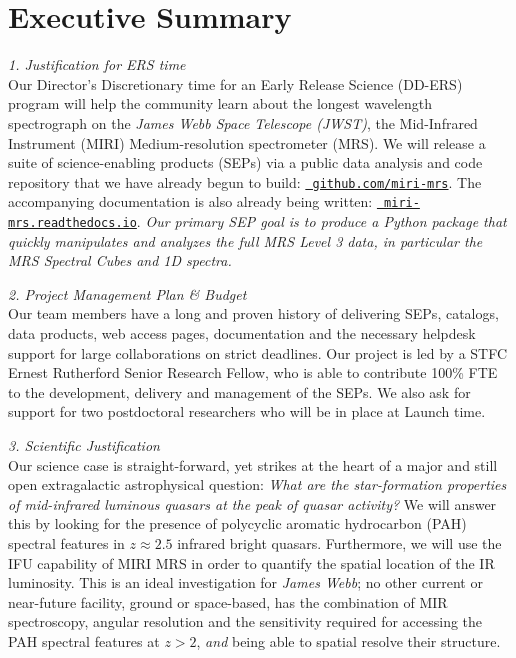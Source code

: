 \vspace{-4pt}
\section*{{\sc Executive Summary}}

\vspace{-6pt}
\noindent
{\it 1. Justification for ERS time}\\
Our Director’s Discretionary time for an Early Release Science
(DD-ERS) program will help the community learn about the longest
wavelength spectrograph on the {\it James Webb Space Telescope (JWST)},
the Mid-Infrared Instrument (MIRI) Medium-resolution spectrometer
(MRS).  We will release a suite of science-enabling products (SEPs)
via a public data analysis and code repository that we have already
begun to build: \href{https://github.com/miri-mrs}{\tt
github.com/miri-mrs}.  The accompanying documentation is also already
being written: \href{http://miri-mrs.readthedocs.io/}{{\tt
miri-mrs.readthedocs.io}}.  {\it Our primary SEP goal is to produce a
Python package that quickly manipulates and analyzes the full MRS
Level 3 data, in particular the MRS Spectral Cubes and 1D spectra. }

\smallskip 
\smallskip \smallskip
\noindent
{\it 2. Project Management Plan \& Budget} \\
Our team members have a long and proven history of delivering SEPs, 
catalogs, data products, web access pages, documentation and the
necessary helpdesk support for large collaborations on strict
deadlines.  Our project is led by a STFC Ernest Rutherford Senior
Research Fellow, who is able to contribute 100\% FTE to the
development, delivery and management of the SEPs.  We also ask for
support for two postdoctoral researchers who will be in place at
Launch time.

\smallskip 
\smallskip \smallskip
\noindent
{\it 3. Scientific Justification}\\
Our science case is straight-forward, yet strikes at the heart of a
major and still open extragalactic astrophysical question: {\it What
are the star-formation properties of mid-infrared luminous quasars at
the peak of quasar activity? } We will answer this by looking for the
presence of polycyclic aromatic hydrocarbon (PAH) spectral features in
$z\approx2.5$ infrared bright quasars.  Furthermore, we will use
the IFU capability of MIRI MRS in order to quantify the spatial
location of the IR luminosity. This is an ideal investigation for
{\it James Webb}; no other current or near-future facility, ground or space-based, has the combination of MIR
spectroscopy, angular resolution and the sensitivity required for
accessing the PAH spectral features at $z>2$, {\it and} being able to
spatial resolve their structure.


